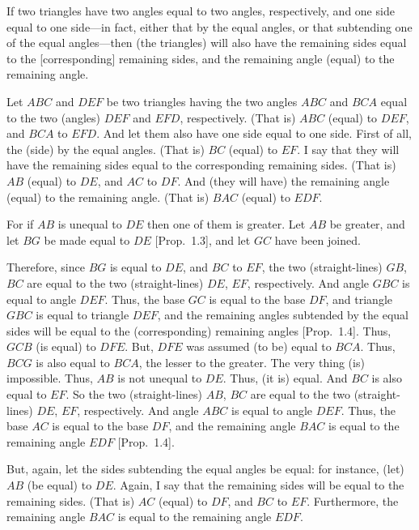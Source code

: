 If  two triangles have two angles equal to two angles, respectively, 
and one side equal to one side---in fact, either that by the equal angles, or that
subtending one of the equal angles---then (the triangles) will also have the remaining
sides equal to the [corresponding] remaining sides, and the
remaining angle (equal) to the remaining angle.

Let $ABC$ and $DEF$ be two triangles having the two angles $ABC$ and
$BCA$ equal to the two (angles) $DEF$ and $EFD$, respectively.
(That is) $ABC$ (equal) to $DEF$, and $BCA$ to $EFD$. And let them also have
one side equal to one side. First of all, the (side) by the equal angles. (That is)
$BC$ (equal) to $EF$. I say that they will have the  remaining sides equal to the
corresponding remaining sides. (That is) $AB$ (equal) to $DE$, and $AC$ to
$DF$. And (they will have) the remaining angle (equal) to the remaining angle.
(That is) $BAC$ (equal) to $EDF$.

For if $AB$ is unequal to $DE$ then one of them is greater. Let $AB$ be greater,
and let $BG$ be made equal to $DE$ [Prop.~1.3], and let $GC$ have been
joined.

Therefore, since $BG$ is equal to $DE$, and $BC$ to $EF$, the two (straight-lines)
$GB$, $BC$ are equal to the two (straight-lines) $DE$, $EF$, respectively. And angle
$GBC$ is equal to angle $DEF$. Thus, the base $GC$ is equal to the base $DF$,
and triangle $GBC$ is equal to triangle $DEF$, and the remaining angles 
subtended by the equal sides will
be equal to the (corresponding) remaining angles [Prop.~1.4].
Thus, $GCB$ (is equal) to $DFE$. But,  $DFE$ was assumed (to be) equal to $BCA$.
Thus, $BCG$ is also equal to $BCA$, the lesser to the greater. The very thing (is) impossible. Thus, $AB$ is not unequal to $DE$. Thus, (it is) equal. And $BC$ is
also equal to $EF$. So the two (straight-lines) $AB$, $BC$ are equal to the two (straight-lines) $DE$, $EF$, respectively. And angle $ABC$ is equal to
angle $DEF$. Thus, the base $AC$ is equal to the base $DF$, and the remaining
angle $BAC$ is equal to the remaining angle $EDF$ [Prop.~1.4].

But, again, let the sides subtending the equal angles be equal: for instance, 
(let) $AB$ (be equal) to
$DE$.  Again, I say that the remaining sides will be equal to the remaining
sides. (That is) $AC$ (equal) to $DF$, and $BC$ to $EF$. Furthermore, the remaining angle
$BAC$ is equal to the remaining angle $EDF$.

